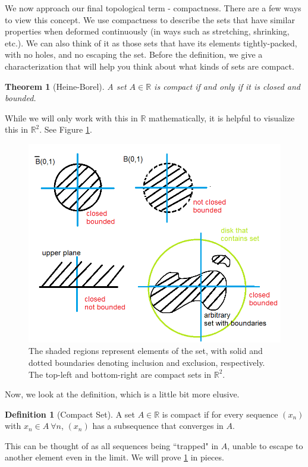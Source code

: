 \documentclass[11pt]{article}
\newcommand{\R}{\ensuremath{\mathbb R}}
\theoremstyle{plain}
\newtheorem{thm}{Theorem}[section]
\theoremstyle{definition}
\newtheorem{defi}{Definition}[section]
\theoremstyle{remark}
\begin{document}
We now approach our final topological term - compactness. There are a few ways to view this concept. We use compactness to describe the sets that have similar properties when deformed continuously (in ways such as stretching, shrinking, etc.). We can also think of it as those sets that have its elements tightly-packed, with no holes, and no escaping the set. Before the definition, we give a characterization that will help you think about what kinds of sets are compact.
\begin{thm}[Heine-Borel]
    A set $A \in \R$ is compact if and only if it is closed and bounded.
    \label{thm:hb}
\end{thm}
While we will only work with this in $\R$ mathematically, it is helpful to visualize this in $\R^2$. See Figure \ref{fig:compact}.
\begin{figure}
    \centering
    \includegraphics[width=\linewidth]{figures/compact.png}
    \caption{The shaded regions represent elements of the set, with solid and dotted boundaries denoting inclusion and exclusion, respectively. The top-left and bottom-right are compact sets in $\R^2$.}
    \label{fig:compact}
\end{figure}
Now, we look at the definition, which is a little bit more elusive.
\begin{defi}[Compact Set]
    A set $A \in \R$ is compact if for every sequence $(x_n)$ with $x_n \in A \ \forall n$, $(x_n)$ has a subsequence that converges in $A$.
\end{defi}
This can be thought of as all sequences being ``trapped" in $A$, unable to escape to another element even in the limit. We will prove \ref{thm:hb} in pieces.
\end{document}
